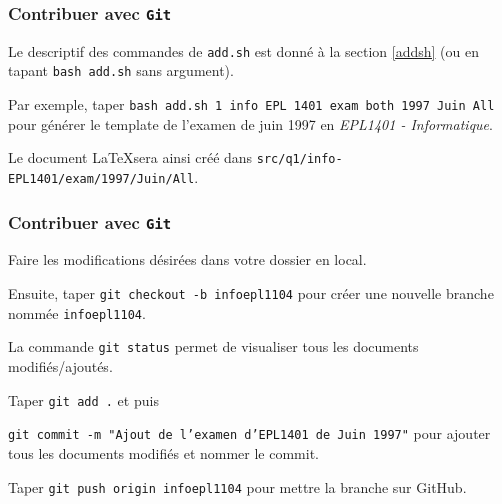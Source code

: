 \documentclass{beamer}
\newenvironment{wideitemize}{\itemize\addtolength{\itemsep}{10pt}}{\enditemize}
\begin{document}
\begin{frame}
    \frametitle{Contribuer avec \texttt{Git}}
    \begin{wideitemize}
         \item Le descriptif des commandes de \texttt{add.sh} est donné à la section \ref{addsh} (ou en tapant \lstinline[mathescape]|bash add.sh| sans argument). 
         
         Par exemple, taper \lstinline[mathescape]|bash add.sh 1 info EPL 1401 exam both 1997 Juin All| pour générer le template de l'examen de juin 1997 en \textit{EPL1401 - Informatique}. 
        
         Le document \LaTeX sera ainsi créé dans \lstinline[mathescape]|src/q1/info-EPL1401/exam/1997/Juin/All|.
     \end{wideitemize}
\end{frame}

\begin{frame}
\label{modif_local}
    \frametitle{Contribuer avec \texttt{Git}}
    \begin{wideitemize}
         \item Faire les modifications désirées dans votre dossier en local.
         \item Ensuite, taper \lstinline[mathescape]|git checkout -b infoepl1104| pour créer une nouvelle branche nommée \lstinline[mathescape]|infoepl1104|.
         \item La commande \lstinline[mathescape]|git status| permet de visualiser tous les documents modifiés/ajoutés.
         \item Taper \lstinline[mathescape]|git add .| et puis
         
         \texttt{git commit -m "Ajout de l'examen d'EPL1401 de Juin 1997"} pour ajouter tous les documents modifiés et nommer le commit.
         \item Taper \lstinline[mathescape]|git push origin infoepl1104| pour mettre la branche sur GitHub.
     \end{wideitemize}
\end{frame}
\end{document}
